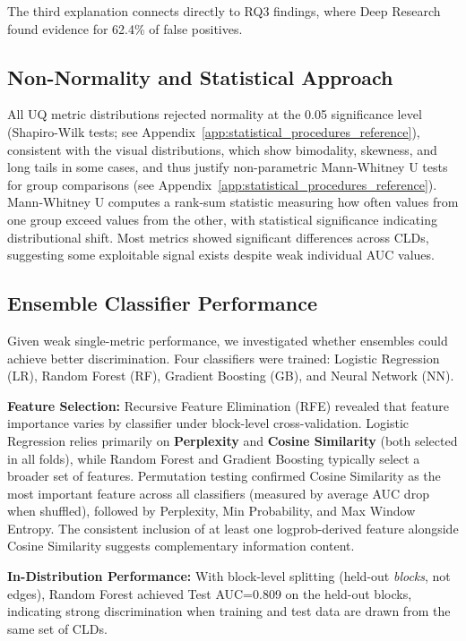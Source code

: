 The third explanation connects directly to RQ3 findings, where Deep Research found evidence for 62.4\% of false positives.

\subsection{Non-Normality and Statistical Approach}

All UQ metric distributions rejected normality at the 0.05 significance level (Shapiro-Wilk tests; see Appendix~\ref{app:statistical_procedures_reference}), consistent with the visual distributions, which show bimodality, skewness, and long tails in some cases, and thus justify non-parametric Mann-Whitney U tests for group comparisons (see Appendix~\ref{app:statistical_procedures_reference}). Mann-Whitney U computes a rank-sum statistic measuring how often values from one group exceed values from the other, with statistical significance indicating distributional shift. Most metrics showed significant differences across CLDs, suggesting some exploitable signal exists despite weak individual AUC values.

\subsection{Ensemble Classifier Performance}

Given weak single-metric performance, we investigated whether ensembles could achieve better discrimination. Four classifiers were trained: Logistic Regression (LR), Random Forest (RF), Gradient Boosting (GB), and Neural Network (NN).

\textbf{Feature Selection:} Recursive Feature Elimination (RFE) revealed that feature importance varies by classifier under block-level cross-validation. Logistic Regression relies primarily on \textbf{Perplexity} and \textbf{Cosine Similarity} (both selected in all folds), while Random Forest and Gradient Boosting typically select a broader set of features. Permutation testing confirmed Cosine Similarity as the most important feature across all classifiers (measured by average AUC drop when shuffled), followed by Perplexity, Min Probability, and Max Window Entropy. The consistent inclusion of at least one logprob-derived feature alongside Cosine Similarity suggests complementary information content.

\textbf{In-Distribution Performance:} With block-level splitting (held-out \textit{blocks}, not edges), Random Forest achieved Test AUC=0.809 on the held-out blocks, indicating strong discrimination when training and test data are drawn from the same set of CLDs.

